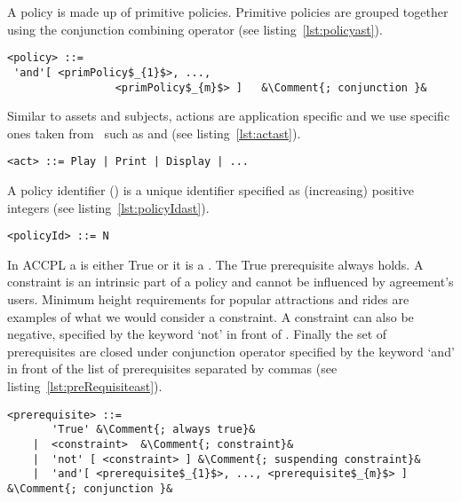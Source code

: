 A policy is made up of primitive policies. Primitive policies are grouped together using the conjunction combining operator (see listing~\ref{lst:policyast}).

\lstset{mathescape, language=AST, escapechar=\&}  
\begin{minipage}[c]{0.95\textwidth}
\begin{lstlisting}[frame=single, caption={policy},label={lst:policyast}]
<policy> ::=  
 'and'[ <primPolicy$_{1}$>, ..., 
                 <primPolicy$_{m}$> ]	&\Comment{; conjunction }&
\end{lstlisting}
\end{minipage}

Similar to assets and subjects, actions are application specific and we use specific ones taken from~\cite{pucella2006} such as  and  (see listing~\ref{lst:actast}).

\lstset{mathescape, language=AST}  
\begin{lstlisting}[frame=single, caption={act},label={lst:actast}]
<act> ::= Play | Print | Display | ...
\end{lstlisting}

A policy identifier () is a unique identifier specified as (increasing) positive integers (see listing~\ref{lst:policyIdast}).

\lstset{mathescape, language=AST}  
\begin{lstlisting}[frame=single, caption={policyId},label={lst:policyIdast}]
<policyId> ::= N
\end{lstlisting}

In \ac{ACCPL} a  is either True or it is a . The True prerequisite always holds. A constraint is an intrinsic part of a policy and cannot be influenced by agreement's users. Minimum height requirements for popular attractions and rides are examples of what we would consider a constraint. A constraint can also be negative, specified by the keyword `not' in front of . Finally the set of prerequisites are closed under conjunction operator specified by the keyword `and' in front of the list of prerequisites separated by commas (see listing~\ref{lst:preRequisiteast}).


\lstset{mathescape, language=AST, escapechar=\&}  
\begin{lstlisting}[frame=single, caption={prerequisite},label={lst:preRequisiteast}]
<prerequisite> ::=  
       'True' &\Comment{; always true}&
    |  <constraint>	 &\Comment{; constraint}&
    |  'not' [ <constraint> ] &\Comment{; suspending constraint}&
    |  'and'[ <prerequisite$_{1}$>, ..., <prerequisite$_{m}$> ] &\Comment{; conjunction }&
\end{lstlisting}


